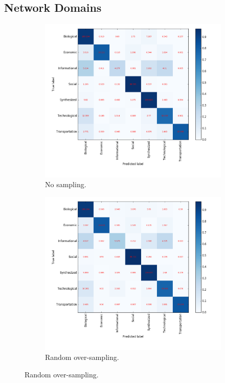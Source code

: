 \documentclass{article}
\begin{document}
 
\subsection{Network Domains}

\begin{figure}[H]
\begin{subfigure}{0.48\textwidth}
\includegraphics[width=\linewidth]{figs/similarity/Domain/None/confusion.png}
\caption{No sampling.} \label{no_confusion}
\end{subfigure}\hspace*{\fill}
\begin{subfigure}{0.48\textwidth}
\includegraphics[width=\linewidth]{figs/similarity/Domain/RandomOver/confusion.png}
\caption{Random over-sampling.} \label{random_over_confusion}
\end{subfigure}


\end{figure}
\end{document}

